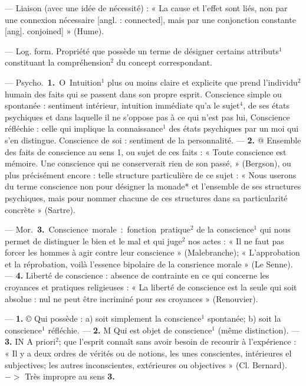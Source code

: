 \begin{itemize}[leftmargin=1cm, label=, itemsep=11pt]
 — Liaison (avec une idée
de nécessité) : « La cause et l'effet
sont liés, non par une connexion
nécessaire [angl. : connected], mais
par une conjonction constante [ang].
conjoined] » (Hume).

 — Log. form. Propriété
que possède un terme de désigner
certains attributs$^1$ constituant la
compréhension$^2$ du concept correspondant.

 — \si{Psycho.} {\bf 1.} O Intuition$^1$
plus ou moins claire et explicite
que prend l'individu$^2$ humain des
faits qui se passent dans son propre
esprit. Conscience simple ou spontanée : sentiment intérieur, intuition
immédiate qu’a le sujet$^4$, de ses
états psychiques et dans laquelle il
ne s'oppose pas à ce qui n’est pas lui,
Conscience réfléchie : celle qui implique
la connaissance$^1$ des états psychiques par un moi qui s’en distingue. Conscience de soi : sentiment
de la personnalité. —  {\bf 2.} @ Ensemble
des faits de conscience au sens 1, ou
sujet de ces faits : « Toute conscience
est mémoire. Une conscience qui ne
conserverait rien de son passé, »
(Bergson), ou plus précisément encore : telle structure particulière de
ce sujet : « Nous userons du terme
conscience non pour désigner la monade* et l’ensemble de ses structures
psychiques, mais pour nommer chacune de ces structures dans sa particularité concrète » (Sartre).

— \si{Mor.}  {\bf 3.} Conscience morale :
fonction pratique$^2$ de la conscience$^1$
qui nous permet de distinguer le
bien et le mal et qui juge$^2$ nos actes :
« Il ne faut pas forcer les hommes à
agir contre leur conscience » (Malebranche); « L’approbation et la
réprobation, voilà l'essence bipolaire de la consrience morale » (Le
Senne). —  {\bf 4.} Liberté de conscience :
absence de contrainte en ce qui
concerne les croyances et pratiques
religieuses : « La liberté de conscience
est la seule qui soit absolue : nul ne
peut être incriminé pour ses croyances » (Renouvier).

 — {\bf 1.} © Qui possède : a) soit
simplement la conscience$^1$ spontanée; b) soit la conscience$^1$ réfléchie.
—  {\bf 2.} M Qui est objet de conscience$^1$
(même distinction). —  {\bf 3.} IN A priori$^2$;
que l'esprit connaît sans avoir besoin
de recourir à l’expérience : « Il y a
deux ordres de vérités ou de notions,
les unes conscientes, intérieures el
subjectives; les autres inconscientes,
extérieures ou objectives » (Cl. Bernard). $->$ Très impropre au
sens  {\bf 3.}


\end{itemize}
